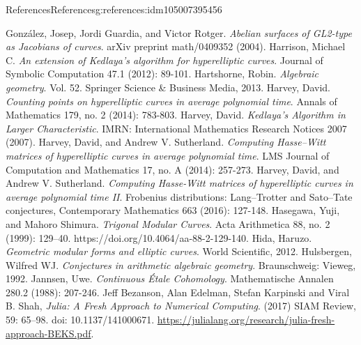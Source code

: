 \documentclass[oneside,10pt,]{book}
\numberwithin{equation}{section}
\begin{document}
\begin{references-chapter-numberless}{References}{}{References}{}{}{g:references:idm105007395456}
\begin{thebibliography}{9}
\hypertarget{x:biblio:bib-gonzales-guardia-rotger}{}González, Josep, Jordi Guardia, and Victor Rotger. \textit{Abelian surfaces of GL2-type as Jacobians of curves}. arXiv preprint math\slash{}0409352 (2004).
\hypertarget{x:biblio:bib-harrison-hyperelliptic}{}Harrison, Michael C. \textit{An extension of Kedlaya's algorithm for hyperelliptic curves}. Journal of Symbolic Computation 47.1 (2012): 89-101.
\hypertarget{x:biblio:bib-hartshorne}{}Hartshorne, Robin. \textit{Algebraic geometry}. Vol. 52. Springer Science \& Business Media, 2013.
\hypertarget{x:biblio:bib-harvey-average}{}Harvey, David. \textit{Counting points on hyperelliptic curves in average polynomial time}. Annals of Mathematics 179, no. 2 (2014): 783-803.
\hypertarget{x:biblio:bib-harvey-sqrtp}{}Harvey, David. \textit{Kedlaya's Algorithm in Larger Characteristic}. IMRN: International Mathematics Research Notices 2007 (2007).
\hypertarget{x:biblio:bib-harvey-sutherland}{}Harvey, David, and Andrew V. Sutherland. \textit{Computing Hasse–Witt matrices of hyperelliptic curves in average polynomial time}. LMS Journal of Computation and Mathematics 17, no. A (2014): 257-273.
\hypertarget{x:biblio:bib-harvey-sutherland-ii}{}Harvey, David, and Andrew V. Sutherland. \textit{Computing Hasse-Witt matrices of hyperelliptic curves in average polynomial time II}. Frobenius distributions: Lang–Trotter and Sato–Tate conjectures, Contemporary Mathematics 663 (2016): 127-148.
\hypertarget{x:biblio:bib-hasegawa-shimura}{}Hasegawa, Yuji, and Mahoro Shimura. \textit{Trigonal Modular Curves}. Acta Arithmetica 88, no. 2 (1999): 129–40. https:\slash{}\slash{}doi.org\slash{}10.4064\slash{}aa-88-2-129-140.
\hypertarget{x:biblio:bib-hida-geometric}{}Hida, Haruzo. \textit{Geometric modular forms and elliptic curves}. World Scientific, 2012.
\hypertarget{x:biblio:bib-hulsbergen}{}Hulsbergen, Wilfred WJ. \textit{Conjectures in arithmetic algebraic geometry}. Braunschweig: Vieweg, 1992.
\hypertarget{x:biblio:bib-jannsen}{}Jannsen, Uwe. \textit{Continuous Étale Cohomology}. Mathematische Annalen 280.2 (1988): 207-246.
\hypertarget{x:biblio:bib-julia}{}Jeff Bezanson, Alan Edelman, Stefan Karpinski and Viral B. Shah, \textit{Julia: A Fresh Approach to Numerical Computing}.  (2017) SIAM Review, 59: 65–98. doi: 10.1137\slash{}141000671. \url{https://julialang.org/research/julia-fresh-approach-BEKS.pdf}.

\end{thebibliography}
\end{references-chapter-numberless}
\end{document}
